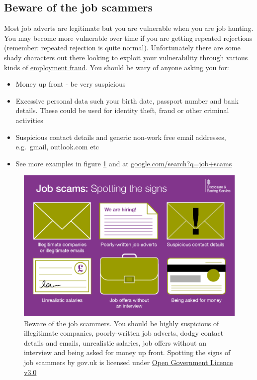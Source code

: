 \documentclass[
]{book}
\providecommand{\tightlist}{%
  \setlength{\itemsep}{0pt}\setlength{\parskip}{0pt}}
\begin{document}
\hypertarget{scams}{%
\subsection{Beware of the job scammers}\label{scams}}

Most job adverts are legitimate but you are vulnerable when you are job hunting. You may become more vulnerable over time if you are getting repeated rejections (remember: repeated rejection is quite normal). Unfortunately there are some shady characters out there looking to exploit your vulnerability through various kinds of \href{https://en.wikipedia.org/wiki/Employment_fraud}{employment fraud}. \citep{jobscammers} You should be wary of anyone asking you for:

\begin{itemize}
\tightlist
\item
  Money up front - be very suspicious
\item
  Excessive personal data such your birth date, passport number and bank details. These could be used for identity theft, fraud or other criminal activities
\item
  Suspicious contact details and generic non-work free email addresses, e.g.~gmail, outlook.com etc \citep{jobscammers2}
\item
  See more examples in figure \ref{fig:jobscams-fig} and at \href{https://www.google.com/search?q=job+scams}{google.com/search?q=job+scams}
\end{itemize}

\begin{figure}

{\centering \includegraphics[width=0.98\linewidth]{images/Job-Scams-Signs-GOVUK} 

}

\caption{Beware of the job scammers. You should be highly suspicious of illegitimate companies, poorly-written job adverts, dodgy contact details and emails, unrealistic salaries, job offers without an interview and being asked for money up front. Spotting the signs of job scammers by gov.uk is licensed under \href{https://www.nationalarchives.gov.uk/doc/open-government-licence/version/3/}{Open Government Licence v3.0} \citep{jobscammers2}}\label{fig:jobscams-fig}
\end{figure}
\end{document}
